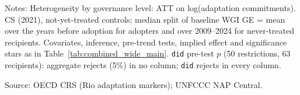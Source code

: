\begin{table}[H]
\centering
\caption{Heterogeneity by governance level: ATT on log(adaptation commitments)}
\label{tab:het_gov_wide}
\begingroup\small
{}
\endgroup
\par\vspace{4pt}
\begin{minipage}{\linewidth}\footnotesize
Notes: Heterogeneity by governance level: ATT on log(adaptation commitments). CS (2021), not-yet-treated controls; median split of baseline WGI GE = mean over the years before adoption for adopters and over 2009--2024 for never-treated recipients. Covariates, inference, pre-trend tests, implied effect and significance stars as in Table~\ref{tab:combined_wide_main}. \texttt{did} pre-test $p$ (50 restrictions, 63 recipients): aggregate rejects (5\%) in no column; \texttt{did} rejects in every column.\par
Source: OECD CRS (Rio adaptation markers); UNFCCC NAP Central.
\end{minipage}
\end{table}
